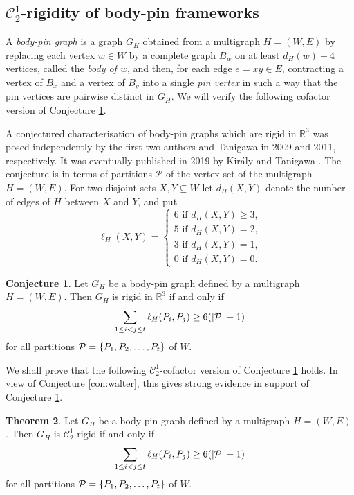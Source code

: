 \documentclass[11pt,a4paper]{article}
\theoremstyle{definition}
\newtheorem{theorem}{Theorem}[section]
\newtheorem{conjecture}[theorem]{Conjecture}
\newcommand{\R}{\mathbb{R}}
\newcommand{\cC}{\mathcal{C}}
\newcommand{\cP}{\mathcal{P}}
\begin{document}
\subsection{$\mathcal{C}_2^1$-rigidity of body-pin frameworks} 
A {\em body-pin graph} is  a graph $G_H$ obtained from a multigraph $H=(W,E)$
by replacing each vertex $w\in W$ by a complete graph $B_w$ on at least $d_H(w)+4$ vertices,  called the {\em body of $w$}, and then, for each edge $e=xy\in E$,  contracting a vertex of $B_x$ and a vertex of $B_y$ into a single {\em pin vertex}
in such a way that the pin vertices  are pairwise distinct in $G_H$.
We will verify the following cofactor version of Conjecture \ref{con:body-pin}.

A conjectured characterisation of body-pin graphs which are rigid in $\R^3$ was
posed independently by the first two authors and Tanigawa in 2009 and 2011, respectively.
It was eventually published in 2019 by Kir\'aly and Tanigawa \cite[Conjecture 5]{KT}. 
The conjecture is     in terms of partitions $\cP$
of the vertex set of the multigraph $H=(W,E)$.
For two disjoint sets $X,Y\subseteq W$ let 
$d_H(X,Y)$ denote the number of edges of $H$ between $X$ and $Y$, and put
$$
\ell_H(X,Y)=
\begin{cases}
6 \mbox{ if $d_H(X,Y)\geq 3$,}\\
5 \mbox{ if $d_H(X,Y)=2$,}\\
3 \mbox{ if $d_H(X,Y)=1$,}\\
0 \mbox{ if $d_H(X,Y)=0$.}
\end{cases}
$$

\begin{conjecture}\label{con:body-pin}
Let $G_H$ be a body-pin graph defined by a multigraph $H=(W,E)$. Then 
$G_H$ is rigid in $\R^3$
if and only if
$$\sum_{1\leq i<j\leq t}
\ell_H(P_i,P_j) \geq 6(|{\cal P}|-1)$$
for all partitions ${\cal P}=\{P_1,P_2,\dots,P_t\}$ of $W$.
\end{conjecture}








\noindent
We shall prove that the following $\cC_2^1$-cofactor version of Conjecture \ref{con:body-pin} holds. 
In view of Conjecture \ref{con:walter}, this gives strong evidence in support of Conjecture \ref{con:body-pin}.





\begin{theorem}\label{thm:body-pin_C12}
Let $G_H$ be a body-pin graph defined by a multigraph $H=(W,E)$. Then 
$G_H$ is $\cC_2^1$-rigid
if and only if
$$\sum_{1\leq i<j\leq t}
\ell_H(P_i,P_j) \geq 6(|{\cal P}|-1)$$
for all partitions ${\cal P}=\{P_1,P_2,\dots,P_t\}$ of $W$.
\end{theorem}
\end{document}
